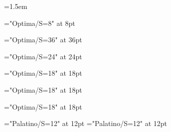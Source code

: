 \emergencystretch=1.5em

\def\displayfontname{Optima}
\def\bodyfontname{Palatino}
\def\bodyfontsize{12}
\def\leading{16pt}
\baselineskip=\leading

\def\pageheaderfontname{\displayfontname}
\def\pageheaderfontsize{8}
\font\pageheaderfont="\pageheaderfontname/S=\pageheaderfontsize" at \pageheaderfontsize pt
\def\pagefooterfont{\pageheaderfont}

\def\titlepagetitlefontname{\displayfontname}
\def\titlepagetitlefontsize{36}
\font\titlepagetitlefont="\titlepagetitlefontname/S=\titlepagetitlefontsize" at \titlepagetitlefontsize pt

\def\titlepageauthorfontname{\displayfontname}
\def\titlepageauthorfontsize{24}
\font\titlepageauthorfont="\titlepageauthorfontname/S=\titlepageauthorfontsize" at \titlepageauthorfontsize pt

\def\titlepagepublisherfontname{\displayfontname}
\def\titlepagepublisherfontsize{18}
\font\titlepagepublisherfont="\titlepagepublisherfontname/S=\titlepagepublisherfontsize" at \titlepagepublisherfontsize pt

\def\infopagetitlefontname{\displayfontname}
\def\infopagetitlefontsize{18}
\font\infopagetitlefont="\infopagetitlefontname/S=\infopagetitlefontsize" at \infopagetitlefontsize pt

\def\sectiontitlefontname{\displayfontname}
\def\sectiontitlefontsize{18}
\font\sectiontitlefont="\displayfontname/S=\sectiontitlefontsize" at \sectiontitlefontsize pt

\font\bodyfont="\bodyfontname/S=\bodyfontsize" at \bodyfontsize pt
\font\leadinfont="\bodyfontname/S=\bodyfontsize" at \bodyfontsize pt

\def\leadin#1{{\leadinstyle#1}}
\def\leadinstyle{\noindent\leadinfont}

\def\emph#1{{\it #1}}

\raggedbottom
